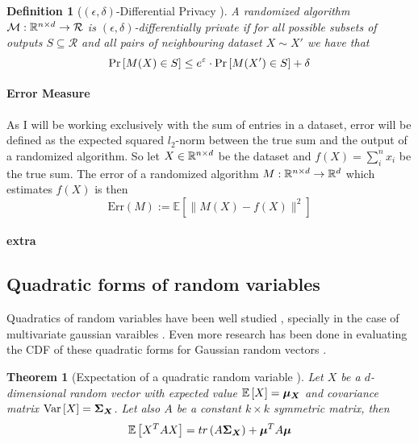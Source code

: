 \documentclass[a4paper,12pt]{article}
\newtheorem{definition}{Definition}[section]
\newtheorem{theorem}{Theorem}
\begin{document}
\vspace*{0.3cm}
\begin{definition}[$(\epsilon, \delta)$-Differential Privacy \cite{dwork2016}]
A randomized algorithm $\mathcal{M}: \mathbb{R}^{n \times d} \rightarrow \mathcal{R}$ 
is $(\epsilon, \delta)$-differentially private if for all possible 
subsets of outputs $S \subseteq \mathcal{R}$ and all pairs of 
neighbouring dataset $X \sim X'$ we have that
\[ \Pr\left [M(X) \in S \right] \le e^{\varepsilon} \cdot \Pr\left [M(X') \in S \right] + \delta \]

    
\end{definition}

\paragraph{Error Measure}
As I will be working exclusively with the sum of entries 
in a dataset, error will be defined as the expected
squared $l_2$-norm between the true sum and 
the output of a randomized algorithm.
So let $X \in \mathbb{R}^{n \times d}$ be the dataset and
$f(X) = \sum_i^n x_i$ be the true sum. The error of a
randomized algorithm $M : \mathbb{R}^{n \times d} \rightarrow \mathbb{R}^d$
which estimates $f(X)$ is then 
\[
    \text{Err}(M) := \mathbb{E} \left[ \| M(X) - f(X) \|^2 \right]
\]

\paragraph{extra}


\subsection{Quadratic forms of random variables}
Quadratics of random variables have been well studied \cite{BatesQuadForm,MathaiQaudForms}, 
specially in the case of multivariate gaussian varaibles \cite{IowaQuadNormForms,MathaiQaudForms}.
Even more research has been done in evaluating the CDF of these quadratic forms
for Gaussian random vectors \cite{QuadFormsNume,QaudFormsBounds}.

\begin{theorem}[Expectation of a quadratic random variable \cite{BatesQuadForm}]
\label{theo:ExpQuad}
Let $X$ be a $d$-dimensional random vector with expected value $\mathbb{E} \left [ X  \right] =  \bm{\mu_{X}}$
and covariance matrix $\text{Var} \left [ X  \right] = \bm{\Sigma_{X}}$. Let also $A$ be a constant 
$k \times k$ symmetric matrix, then 
\[
    \mathbb{E} \left [ X^T A X  \right] = tr \left (A \bm{\Sigma_X}\right) + \bm{\mu}^T A\bm{\mu}
\]
\end{theorem}
\end{document}
